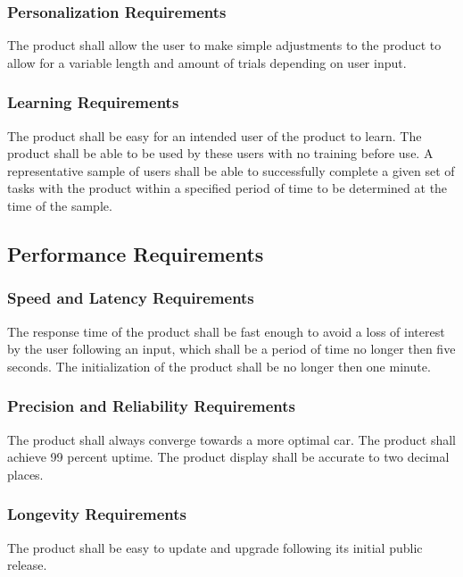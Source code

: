 \documentclass[12pt, titlepage]{article}
\begin{document}
\subsubsection{Personalization Requirements}

The product shall allow the user to make simple adjustments to the product to 
allow for a variable length and amount of trials depending on user input. 

\subsubsection{Learning Requirements}

The product shall be easy for an intended user of the product to learn. The 
product shall be able to be used by these users with no training before use. A 
representative sample of users shall be able to successfully complete a given 
set of tasks with the product within a specified period of time to be determined 
at the time of the sample.

\subsection{Performance Requirements}

\subsubsection{Speed and Latency Requirements}

The response time of the product shall be fast enough to avoid a loss of 
interest by the user following an input, which shall be a period of time no 
longer then five seconds. The initialization of the product shall be no longer 
then one minute.

\subsubsection{Precision and Reliability Requirements}

The product shall always converge towards a more optimal car. The product shall 
achieve 99 percent uptime. The product display shall be accurate to two decimal 
places.

\subsubsection{Longevity Requirements}

The product shall be easy to update and upgrade following its initial public 
release. 
\end{document}
